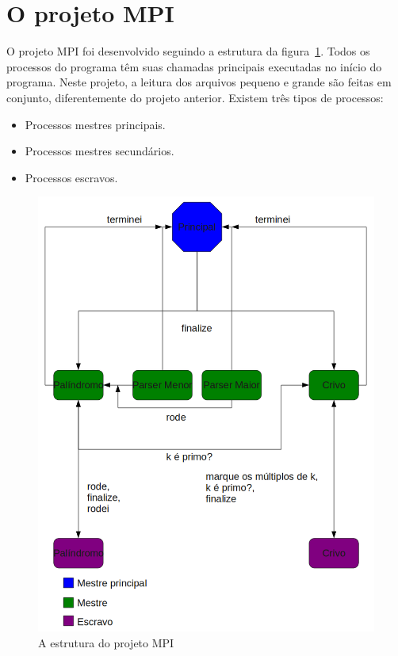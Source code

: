 \documentclass[a4paper]{article}
\begin{document}
\section{O projeto MPI}
\indent \indent O projeto MPI foi desenvolvido seguindo a estrutura da figura~\ref{pic-mpi}. Todos os processos do programa têm suas chamadas principais executadas no início do programa. Neste projeto, a leitura dos arquivos pequeno e grande são feitas em conjunto, diferentemente do projeto anterior. Existem três tipos de processos:
\begin{itemize}
	\item Processos mestres principais.
	\item Processos mestres secundários.
	\item Processos escravos.
\end{itemize}
\begin{figure}[float=p]
	\includegraphics[scale=0.5]{pic-mpi}
	\caption{A estrutura do projeto MPI}
	\label{pic-mpi}
\end{figure}
\end{document}
